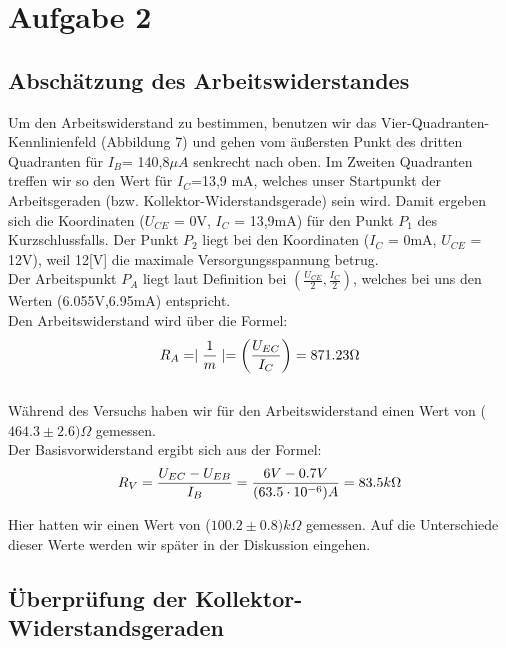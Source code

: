 \section{Aufgabe 2}
\subsection{Abschätzung des Arbeitswiderstandes}

Um den Arbeitswiderstand zu bestimmen, benutzen wir das Vier-Quadranten-Kennlinienfeld (Abbildung 7) und gehen vom äußersten Punkt des dritten Quadranten für \(I_B\)= 140,8\(\mu A\) senkrecht nach oben. Im Zweiten Quadranten treffen wir so den Wert für \(I_C\)=13,9 mA, welches unser Startpunkt der Arbeitsgeraden (bzw. Kollektor-Widerstandsgerade) sein wird. Damit ergeben sich die Koordinaten (\(U_{CE}\) = 0V, \(I_{C}\) = 13,9mA) für den Punkt \(P_1\) des Kurzschlussfalls. Der Punkt \(P_2\) liegt bei den Koordinaten (\(I_{C}\) = 0mA, \(U_{CE}\) = 12V), weil 12[V] die maximale Versorgungsspannung betrug.\\
Der Arbeitspunkt \(P_{A}\) liegt laut Definition bei \(\left(\frac{U_{CE}}{2}, \frac{I_{C}}{2}\right)\), welches bei uns den Werten (6.055V,6.95mA) entspricht.\\

Den Arbeitswiderstand wird über die Formel:
\begin{equation}
\notag
R_{A}=\mid \frac{1}{m}\mid = \left(\frac{U_{EC}}{I_C}\right) = 871.23 \Omega
\end{equation}\\

Während des Versuchs haben wir für den Arbeitswiderstand einen Wert von (\(464.3\pm 2.6)\Omega\) gemessen.\\

Der Basisvorwiderstand ergibt sich aus der Formel:
\begin{equation}
\notag
R_V= \frac{U_{EC}-U_{EB}}{I_B}=\frac{6V-0.7V}{(63.5\cdot 10^{-6})A}=83.5k\Omega
\end{equation}

Hier hatten wir einen Wert von (\(100.2\pm 0.8)k\Omega\) gemessen. Auf die Unterschiede dieser Werte werden wir später in der Diskussion eingehen.

\subsection{Überprüfung der Kollektor-Widerstandsgeraden}

